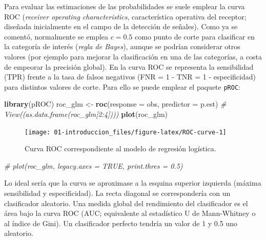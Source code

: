 \documentclass[
  spanish,
]{book}
\newenvironment{Shaded}{\begin{snugshade}}{\end{snugshade}}
\newcommand{\CommentTok}[1]{\textcolor[rgb]{0.56,0.35,0.01}{\textit{#1}}}
\newcommand{\DataTypeTok}[1]{\textcolor[rgb]{0.13,0.29,0.53}{#1}}
\newcommand{\KeywordTok}[1]{\textcolor[rgb]{0.13,0.29,0.53}{\textbf{#1}}}
\newcommand{\NormalTok}[1]{#1}
\newcommand{\StringTok}[1]{\textcolor[rgb]{0.31,0.60,0.02}{#1}}
\theoremstyle{break}
\theoremstyle{definition}
\theoremstyle{definition}
\theoremstyle{definition}
\theoremstyle{remark}
\begin{document}
Para evaluar las estimaciones de las probabilidades se suele emplear la curva ROC (\emph{receiver operating characteristics}, característica operativa del receptor; diseñada inicialmente en el campo de la detección de señales).
Como ya se comentó, normalmente se emplea \(c = 0.5\) como punto de corte para clasificar en la categoría de interés (\emph{regla de Bayes}), aunque se podrían considerar otros valores (por ejemplo para mejorar la clasificación en una de las categorías, a costa de empeorar la precisión global).
En la curva ROC se representa la sensibilidad (TPR) frente a la tasa de falsos negativos (FNR = 1 - TNR = 1 - especificidad) para distintos valores de corte.
Para ello se puede emplear el paquete \texttt{pROC}:

\begin{Shaded}
\begin{Highlighting}[]
\KeywordTok{library}\NormalTok{(pROC)}
\NormalTok{roc_glm <-}\StringTok{ }\KeywordTok{roc}\NormalTok{(}\DataTypeTok{response =}\NormalTok{ obs, }\DataTypeTok{predictor =}\NormalTok{ p.est)}
\CommentTok{# View((as.data.frame(roc_glm[2:4])))}
\KeywordTok{plot}\NormalTok{(roc_glm)}
\end{Highlighting}
\end{Shaded}

\begin{figure}[!htb]

{\centering \texttt{[image: 01-introduccion\_files/figure-latex/ROC-curve-1]} 

}

\caption{Curva ROC correspondiente al modelo de regresión logística.}\label{fig:ROC-curve}
\end{figure}

\begin{Shaded}
\begin{Highlighting}[]
\CommentTok{# plot(roc_glm, legacy.axes = TRUE, print.thres = 0.5)}
\end{Highlighting}
\end{Shaded}

Lo ideal sería que la curva se aproximase a la esquina superior izquierda (máxima sensibilidad y especificidad).
La recta diagonal se correspondería con un clasificador aleatorio.
Una medida global del rendimiento del clasificador es el área bajo la curva ROC (AUC; equivalente al estadístico U de Mann-Whitney o al índice de Gini).
Un clasificador perfecto tendría un valor de 1 y 0.5 uno aleatorio.

\begin{Shaded}
\end{Shaded}
\end{document}

